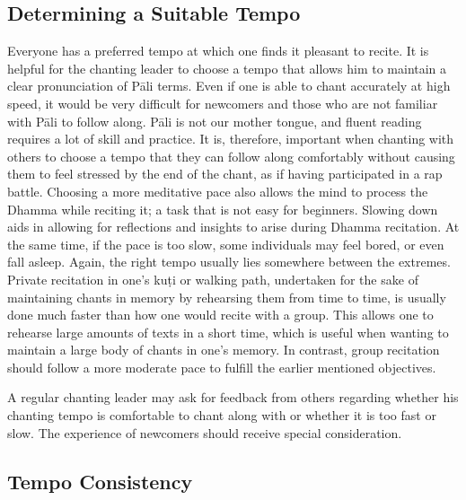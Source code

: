 \subsection*{Determining a Suitable Tempo}

Everyone has a preferred tempo at which one finds it pleasant to recite. It is helpful for the chanting leader to choose a tempo that allows him to maintain a clear pronunciation of Pāli terms. Even if one is able to chant accurately at high speed, it would be very difficult for newcomers and those who are not familiar with Pāli to follow along. Pāli is not our mother tongue, and fluent reading requires a lot of skill and practice. It is, therefore, important when chanting with others to choose a tempo that they can follow along comfortably without causing them to feel stressed by the end of the chant, as if having participated in a rap battle. Choosing a more meditative pace also allows the mind to process the Dhamma while reciting it; a task that is not easy for beginners. Slowing down aids in allowing for reflections and insights to arise during Dhamma recitation. At the same time, if the pace is too slow, some individuals may feel bored, or even fall asleep. Again, the right tempo usually lies somewhere between the extremes. Private recitation in one's kuṭi or walking path, undertaken for the sake of maintaining chants in memory by rehearsing them from time to time, is usually done much faster than how one would recite with a group. This allows one to rehearse large amounts of texts in a short time, which is useful when wanting to maintain a large body of chants in one's memory. \ifbfive\clearpage\fi In contrast, group recitation should follow a more moderate pace to fulfill the earlier mentioned objectives.

A regular chanting leader may ask for feedback from others regarding whether his chanting tempo is comfortable to chant along with or whether it is too fast or slow. The experience of newcomers should receive special consideration.

\ifbfive\vspace{-0.14cm}\fi

\subsection*{Tempo Consistency}

